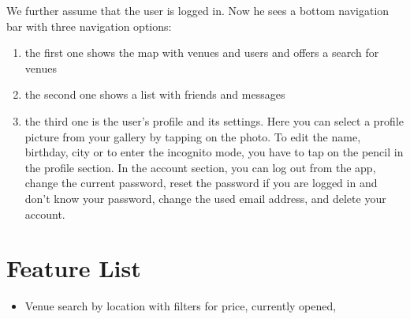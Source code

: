 \documentclass[11pt, accentcolor=tud1c]{tudreport}
\begin{document}
We further assume that the user is logged in. Now he sees a bottom navigation bar with three navigation options:
\begin{enumerate}
\item the first one shows the map with venues and users and offers a search for venues
\item the second one shows a list with friends and messages
\item the third one is the user's profile and its settings. Here you can select a profile picture from your gallery by tapping on the photo. To edit the name, birthday, city or to enter the incognito mode, you have to tap on the pencil in the profile section. In the account section, you can log out from the app, change the current password, reset the password if you are logged in and don't know your password, change the used email address, and delete your account.
\end{enumerate}

\chapter{Feature List}\label{ch:feature_list}
\begin{itemize}
\item Venue search by location with filters for price, currently opened, 

\end{itemize}
\end{document}
